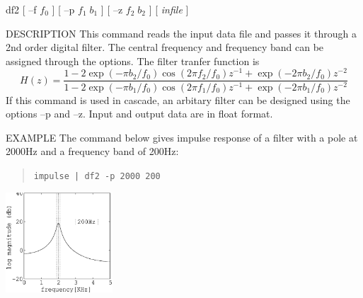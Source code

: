 
\begin{synopsis}
 \item[df2] [ --f $f_0$ ] [ --p $f_1 \; b_1$ ] [ --z $f_2 \; b_2$ ] 
	    [ {\em infile} ]
 \end{synopsis}

 \begin{qsection}{DESCRIPTION}
 This command reads the input data file and passes it through a 2nd
  order digital filter. The central frequency and frequency band can
  be assigned through the options.
  The filter tranfer function is
  \[
   H(z)=\frac{1-2\exp(-\pi b_2/f_0)\cos(2\pi f_2/f_0)z^{-1} +
	\exp(-2\pi b_2/f_0)z^{-2}}
   {1-2\exp(-\pi b_1/f_0)\cos(2\pi f_1/f_0)z^{-1}+\exp(-2\pi b_1/f_0)z^{-2}}
  \]
 If this command is used in cascade, an arbitary filter can be
 designed using the options --p and --z.
 Input and output data are in float format.
 \end{qsection}

\begin{options}
\end{options} 

\begin{qsection}{EXAMPLE}
The command below gives impulse response of a filter with
a pole at 2000Hz and a frequency band of 200Hz:
\begin{quote}
 \verb!impulse | df2 -p 2000 200 !
\end{quote}
\hspace{3cm}
\includegraphics[width=4cm]{fig/df2.eps}
\end{qsection}
